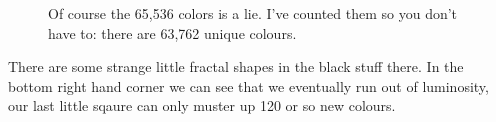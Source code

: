 \begin{figure}[H]
    \centering
    \begin{adjustbox}{width=5cm,center}
    \end{adjustbox}
\caption{Of course the 65,536 colors is a lie. I've counted them so you don't have to: there are 63,762 unique colours.}
\end{figure}

There are some strange little fractal shapes in the black stuff there. In the bottom right hand corner we can see that we eventually
run out of luminosity, our last little sqaure can only muster up 120 or so new colours.


